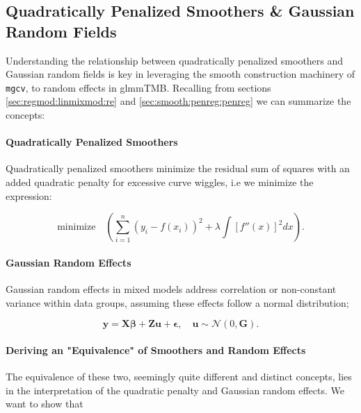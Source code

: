 \documentclass[12pt, twoside,hidelinks]{article}
\theoremstyle{definition}
\numberwithin{equation}{section}
\begin{document}
\subsection{Quadratically Penalized Smoothers \&  Gaussian Random Fields}\label{sec:gaussian_random_quad_pen_smooth_equal}

Understanding the relationship between quadratically penalized smoothers and Gaussian random fields is key in leveraging the smooth construction machinery of \texttt{mgcv}, to random effects in glmmTMB. Recalling from sections \ref{sec:regmod:linmixmod:re} and \ref{sec:smooth:penreg:penreg} we can summarize the concepts:

\paragraph{Quadratically Penalized Smoothers}\label{sec:gaussian:quadpen}
Quadratically penalized smoothers minimize the residual sum of squares with an added quadratic penalty for excessive curve wiggles, i.e we minimize the expression:

\begin{equation}
    \text{minimize} \quad \left( \sum_{i=1}^{n} (y_i - f(x_i))^2 + \lambda \int [f''(x)]^2 dx \right).
    \label{eq:quadratic_penalty}
\end{equation}

\paragraph{Gaussian Random Effects}\label{sec:gaussian:re}
Gaussian random effects in mixed models address correlation or non-constant variance within data groups, assuming these effects follow a normal distribution;

\begin{equation}
\boldsymbol{y} = \mathbf{X}\boldsymbol{\beta} + \mathbf{Z}\boldsymbol{u} + \boldsymbol{\epsilon}, \quad \boldsymbol{u} \sim \mathcal{N}(0, \mathbf{G}).
\label{eq:gaussian_random_effects}
\end{equation}

\paragraph{Deriving an "Equivalence" of Smoothers and Random Effects}\label{sec:gaussian:equivalence}
The equivalence of these two, seemingly quite different and distinct concepts, lies in the interpretation of the quadratic penalty and Gaussian random effects. We want to show that
\end{document}

